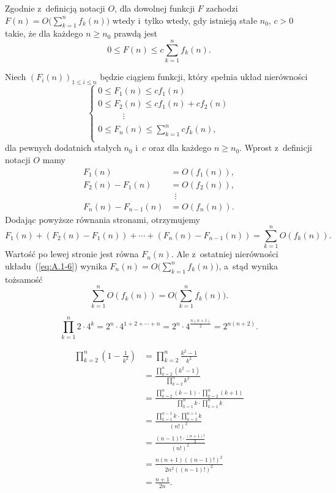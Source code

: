 \exercise %
Zgodnie z~definicją notacji $O$, dla dowolnej funkcji $F$ zachodzi $F(n) = O\bigl(\sum_{k=1}^nf_k(n)\bigr)$ wtedy i~tylko wtedy, gdy istnieją stałe $n_0$, $c>0$ takie, że dla każdego $n\ge n_0$ prawdą jest
\[
	0\le F(n)\le c\sum_{k=1}^n f_k(n).
\]

Niech $(F_i(n))_{1\le i\le n}$ będzie ciągiem funkcji, który spełnia układ nierówności
\[
	\begin{cases}
		0 \le F_1(n) \le cf_1(n) \\
		0 \le F_2(n) \le cf_1(n)+cf_2(n) \\
		\phantom{0 \le F_2} \vdots \\
		0 \le F_n(n) \le \sum_{k=1}^ncf_k(n), \\
	\end{cases} \tag{$*$}\label{eq:A.1-6}
\]
dla pewnych dodatnich stałych $n_0$ i~$c$ oraz dla każdego $n\ge n_0$. Wprost z~definicji notacji $O$ mamy
\begin{align*}
	F_1(n) &= O(f_1(n)), \\
	F_2(n)-F_1(n) &= O(f_2(n)), \\
	& \,\,\,\vdots \\
	F_n(n)-F_{n-1}(n) &= O(f_n(n)).
\end{align*}
Dodając powyższe równania stronami, otrzymujemy
\[
	F_1(n)+(F_2(n)-F_1(n))+\cdots+(F_n(n)-F_{n-1}(n)) = \sum_{k=1}^nO(f_k(n)).
\]
Wartość po lewej stronie jest równa $F_n(n)$. Ale z~ostatniej nierówności układu~(\ref{eq:A.1-6}) wynika $F_n(n)=O\bigl(\sum_{k=1}^nf_k(n)\bigr)$, a~stąd wynika tożsamość
\[
	\sum_{k=1}^nO(f_k(n)) = O\biggl(\sum_{k=1}^nf_k(n)\biggr).
\]

\exercise %
\[
	\prod_{k=1}^n2\cdot 4^k = 2^n\cdot 4^{1+2+\cdots+n} = 2^n\cdot 4^{\frac{n(n+1)}{2}} = 2^{n(n+2)}.
\]

\exercise %
\begin{align*}
	\prod_{k=2}^n\left(1-\frac{1}{k^2}\right) &= \prod_{k=2}^n\frac{k^2-1}{k^2} \\[2mm]
	&= \frac{\prod_{k=2}^n(k^2-1)}{\prod_{k=2}^nk^2} \\[2mm]
	&= \frac{\prod_{k=2}^n(k-1)\cdot\prod_{k=2}^n(k+1)}{\prod_{k=1}^nk\cdot\prod_{k=1}^nk} \\[2mm]
	&= \frac{\prod_{k=1}^{n-1}k\cdot\prod_{k=3}^{n+1}k}{(n!)^2} \\[2mm]
	&= \frac{(n-1)!\cdot\frac{(n+1)!}{2}}{(n!)^2} \\[2mm]
	&= \frac{n(n+1)((n-1)!)^2}{2n^2((n-1)!)^2} \\[2mm]
	&= \frac{n+1}{2n}.
\end{align*}

